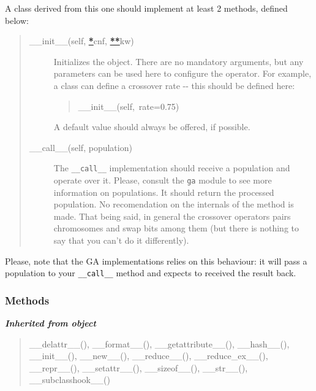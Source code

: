 A class derived from this one should implement at least 2 methods, defined
below:
%
\begin{quote}
%
\begin{description}
\item[{\_\_init\_\_(self, %
\hyperlink{id1}{\textbf{\color{red}*}}cnf, %
\hyperlink{id3}{\textbf{\color{red}**}}kw)}] \leavevmode 
Initializes the object. There are no mandatory arguments, but any
parameters can be used here to configure the operator. For example, a
class can define a crossover rate -{}- this should be defined here:
%
\begin{quote}{\ttfamily \raggedright \noindent
\_\_init\_\_(self,~rate=0.75)
}
\end{quote}

A default value should always be offered, if possible.

\item[{\_\_call\_\_(self, population)}] \leavevmode 
The \texttt{\_\_call\_\_} implementation should receive a population and operate
over it. Please, consult the \texttt{ga} module to see more information on
populations. It should return the processed population. No recomendation
on the internals of the method is made. That being said, in general the
crossover operators pairs chromosomes and swap bits among them (but
there is nothing to say that you can't do it differently).

\end{description}

\end{quote}

Please, note that the GA implementations relies on this behaviour: it will
pass a population to your \texttt{\_\_call\_\_} method and expects to received the
result back.


  \subsubsection{Methods}


\large{\textbf{\textit{Inherited from object}}}

\begin{quote}
\_\_delattr\_\_(), \_\_format\_\_(), \_\_getattribute\_\_(), \_\_hash\_\_(), \_\_init\_\_(), \_\_new\_\_(), \_\_reduce\_\_(), \_\_reduce\_ex\_\_(), \_\_repr\_\_(), \_\_setattr\_\_(), \_\_sizeof\_\_(), \_\_str\_\_(), \_\_subclasshook\_\_()
\end{quote}

